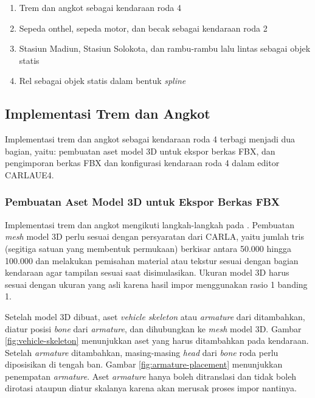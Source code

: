 \begin{enumerate}
    \item Trem dan angkot sebagai kendaraan roda 4
    \item Sepeda onthel, sepeda motor, dan becak sebagai kendaraan roda 2
    \item Stasiun Madiun, Stasiun Solokota, dan rambu-rambu lalu lintas sebagai
    objek statis
    \item Rel sebagai objek statis dalam bentuk \textit{spline}
\end{enumerate}


\subsection{Implementasi Trem dan Angkot}

Implementasi trem dan angkot sebagai kendaraan roda 4 terbagi menjadi dua
bagian, yaitu: pembuatan aset model 3D untuk ekspor berkas FBX, dan
pengimporan berkas FBX dan konfigurasi kendaraan roda 4 dalam editor CARLAUE4.

\subsubsection{Pembuatan Aset Model 3D untuk Ekspor Berkas FBX}

Implementasi trem dan angkot mengikuti langkah-langkah pada
\textcite{carla-documentation}. Pembuatan \textit{mesh} model 3D perlu sesuai
dengan persyaratan dari CARLA, yaitu jumlah tris (segitiga satuan yang membentuk
permukaan) berkisar antara 50.000 hingga 100.000 dan melakukan pemisahan
material atau tekstur sesuai dengan bagian kendaraan agar tampilan sesuai saat
disimulasikan. Ukuran model 3D harus sesuai dengan ukuran yang asli karena hasil
impor menggunakan rasio 1 banding 1.

Setelah model 3D dibuat, aset \textit{vehicle skeleton} atau \textit{armature}
dari \textcite{carla-documentation} ditambahkan, diatur posisi \textit{bone}
dari \textit{armature}, dan dihubungkan ke \textit{mesh} model 3D. Gambar
\ref{fig:vehicle-skeleton} menunjukkan aset yang harus ditambahkan pada
kendaraan. Setelah \textit{armature} ditambahkan, masing-masing \textit{head}
dari \textit{bone} roda perlu diposisikan di tengah ban. Gambar
\ref{fig:armature-placement} menunjukkan penempatan \textit{armature}. Aset
\textit{armature} hanya boleh ditranslasi dan tidak boleh dirotasi ataupun
diatur skalanya karena akan merusak proses impor nantinya.

